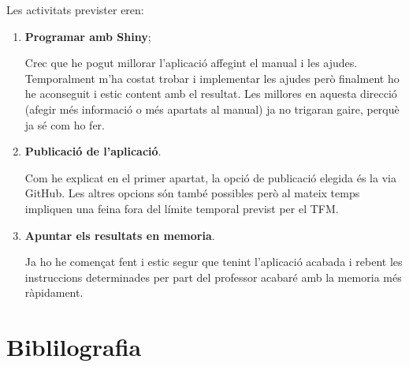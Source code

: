 \documentclass[]{article}
\begin{document}
Les activitats previster eren:
\begin{enumerate}
\item \textbf{Programar amb Shiny};

	 Crec que he pogut millorar l'aplicació affegint el manual i les ajudes. Temporalment m'ha costat trobar i implementar les ajudes però finalment ho he aconseguit i estic content amb el resultat. Les millores en aquesta direcció (afegir més informació o més apartats al manual) ja no trigaran gaire, perquè ja sé com ho fer.
	 
\item \textbf{Publicació de l'aplicació}.

Com he explicat en el primer apartat, la opció de publicació elegida és la via GitHub. Les altres opcions són també possibles però al mateix temps impliquen una feina fora del límite temporal previst per el TFM. 

\item \textbf{Apuntar els resultats en memoria}.

Ja ho he començat fent i estic segur que tenint l'aplicació acabada  i rebent les instruccions determinades per part del professor acabaré amb la memoria més ràpidament. 

\end{enumerate}

\section*{Biblilografia}

\begingroup
\renewcommand{\section}[2]{}%

\endgroup

\end{document}
